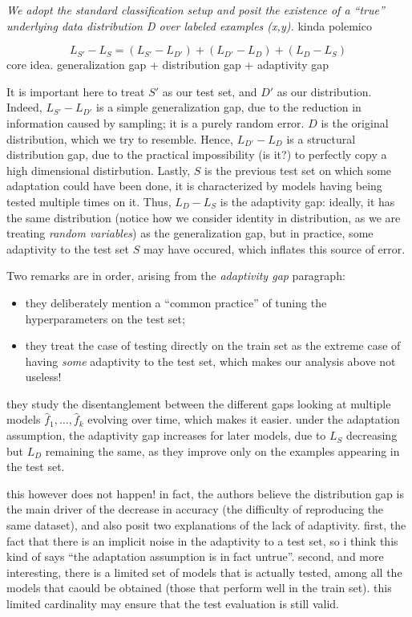 {\it We adopt the standard classification setup and posit the
existence of a “true” underlying data distribution D over
labeled examples (x,y).} kinda polemico

\[L_{S'} - L_S = (L_{S'} - L_{D'}) + (L_{D'} - L_D) + (L_D - L_S)
\]
core idea. generalization gap + distribution gap + adaptivity gap

It is important here to treat $S'$ as our test set, and $D'$ as our distribution. Indeed, $L_{S'} - L_{D'}$ is a simple generalization gap, due to the reduction in information caused by sampling; it is a purely random error. 
$D$ is the original distribution, which we try to resemble. Hence, $L_{D'}-L_D$ is a structural distribution gap, due to the practical impossibility (is it?) to perfectly copy a high dimensional distirbution. Lastly, $S$ is the previous test set on which some adaptation could have been done, it is characterized by models having being tested multiple times on it. Thus, $L_D - L_S$ is the adaptivity gap: ideally, it has the same distribution (notice how we consider identity in distribution, as we are treating {\it random variables}) as the generalization gap, but in practice, some adaptivity to the test set $S$ may have occured, which inflates this source of error. 

\begin{remark}
    Two remarks are in order, arising from the {\it adaptivity gap\/} paragraph:
    \begin{itemize}
        \item they deliberately mention a ``common practice'' of tuning the hyperparameters on the test set;
        \item they treat the case of testing directly on the train set as the extreme case of having {\it some\/} adaptivity to the test set, which makes our analysis above not useless!
    \end{itemize}
\end{remark}

they study the disentanglement between the different gaps looking at multiple models $\hat f_1,\ldots, \hat f_k$ evolving over time, which makes it easier. under the adaptation assumption, the adaptivity gap increases for later models, due to $L_S$ decreasing but $L_D$ remaining the same, as they improve only on the examples appearing in the test set. 

this however does not happen! in fact, the authors believe the distribution gap is the main driver of the decrease in accuracy (the difficulty of reproducing the same dataset), and also posit two explanations of the lack of adaptivity. first, the fact that there is an implicit noise in the adaptivity to a test set, so i think this kind of says ``the adaptation assumption is in fact untrue''. second, and more interesting, there is a limited set of models that is actually tested, among all the models that caould be obtained (those that perform well in the train set). this limited cardinality may ensure that the test evaluation is still valid. 
\\

